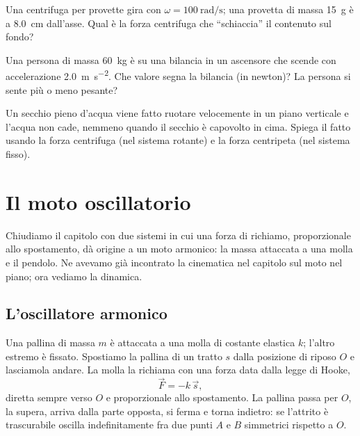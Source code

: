 \begin{esercizio}
Una centrifuga per provette gira con $\omega = \SI{100}{\radian\per\second}$; una provetta di massa \SI{15}{\gram} è a \SI{8,0}{\centi\metre} dall'asse. Qual è la forza centrifuga che ``schiaccia'' il contenuto sul fondo?\\
\end{esercizio}

\begin{esercizio}
Una persona di massa \SI{60}{\kilo\gram} è su una bilancia in un ascensore che scende con accelerazione \SI{2,0}{\metre\per\second\squared}. Che valore segna la bilancia (in newton)? La persona si sente più o meno pesante?\\
\end{esercizio}

\begin{esercizio}
Un secchio pieno d'acqua viene fatto ruotare velocemente in un piano verticale e l'acqua non cade, nemmeno quando il secchio è capovolto in cima. Spiega il fatto usando la forza centrifuga (nel sistema rotante) e la forza centripeta (nel sistema fisso).\\
\end{esercizio}

\section{Il moto oscillatorio}

Chiudiamo il capitolo con due sistemi in cui una forza di richiamo, proporzionale allo spostamento, dà origine a un moto armonico: la massa attaccata a una molla e il pendolo. Ne avevamo già incontrato la cinematica nel capitolo sul moto nel piano; ora vediamo la dinamica.

\subsection{L'oscillatore armonico}
Una pallina di massa $m$ è attaccata a una molla di costante elastica $k$; l'altro estremo è fissato. Spostiamo la pallina di un tratto $s$ dalla posizione di riposo $O$ e lasciamola andare. La molla la richiama con una forza data dalla legge di Hooke,
\[ \vec F = -k\,\vec s, \]
diretta sempre verso $O$ e proporzionale allo spostamento. La pallina passa per $O$, la supera, arriva dalla parte opposta, si ferma e torna indietro: se l'attrito è trascurabile oscilla indefinitamente fra due punti $A$ e $B$ simmetrici rispetto a $O$.

